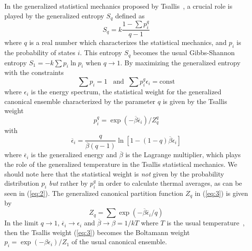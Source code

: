 In the generalized statistical mechanics proposed by
Tsallis~\cite{Ts}, a crucial role is played by the generalized
entropy $S_{q}$ defined as
\begin{equation}
S_{q}=k\frac{1-\sum p_{i}^{q}}{q-1}
\label{eq:1}
\end{equation}
where $q$ is a real number which characterizes the statistical
mechanics, and $p_{i}$ is the probability of states $i$. This
entropy $S_{q}$ becomes the usual Gibbs-Shannon entropy
$S_{1}=-k\sum p_{i}\ln p_{i}$ when $q\rightarrow 1$. By
maximizing the generalized entropy with the constraints
\begin{equation}
\sum p_{i}=1\;\;\;\mbox{and}\;\; \sum p_{i}^{q}\epsilon_{i}=\mbox{const}
\label{eq:2}
\end{equation}
where $\epsilon_{i}$ is the energy spectrum, the statistical weight
for the generalized canonical ensemble characterized by the
parameter $q$ is given by the Tsallis weight
\begin{equation}
p_{i}^{q}=\exp\left(-\overline{\beta}\overline{\epsilon}_{i}\right)/Z_{q}^{q}
\label{eq:3}
\end{equation}
with
\begin{equation}
\overline{\epsilon}_{i}=\frac{q}{\overline{\beta}(q-1)}
\ln\left[1-(1-q)\overline{\beta}\epsilon_{i }\right]
\label{eq:4}
\end{equation}
where $\overline{\epsilon}_{i}$ is the generalized energy and
$\overline{\beta}$ is the Lagrange multiplier, which plays the
role of the generalized temperature in the Tsallis statistical
mechanics. We should note here that the statistical weight is
{\it not} given by the probability distribution $p_{i}$ {\it but}
rather by $p_{i}^{q}$ in order to calculate thermal averages, as
can be seen in (\ref{eq:2}). The generalized canonical partition
function $Z_{q}$ in (\ref{eq:3}) is given by
\begin{equation}
Z_{q}=\sum \exp\left(-\overline{\beta}\overline{\epsilon}_{i}/q\right)
\label{eq:5}
\end{equation}
In the limit $q\rightarrow 1$, $\overline{\epsilon}_{i}\rightarrow
\epsilon_{i}$
and $\overline{\beta}\rightarrow\beta=1/kT$ where $T$ is the usual
temperature~\cite{CT}, then the Tsallis weight (\ref{eq:3}) becomes the
Boltamann weight $p_{i}=\exp(-\beta\epsilon_{i})/Z_{1}$ of the usual
canonical ensemble.

